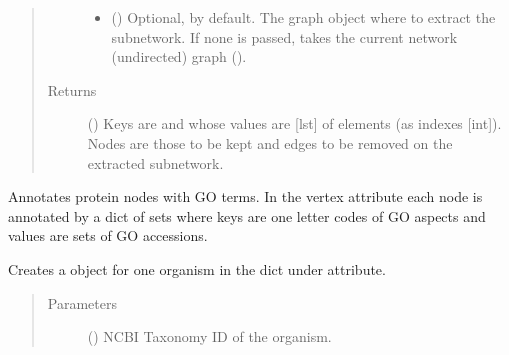 \documentclass[letterpaper,10pt,english]{sphinxmanual}
\begin{document}
\begin{fulllineitems}
\begin{fulllineitems}
\begin{quote}
\begin{description}
\begin{itemize}
\item {} 
 () \textendash{} Optional,  by default. The graph object where to
extract the subnetwork. If none is passed, takes the current
network (undirected) graph
().

\end{itemize}

\item[{Returns}] \leavevmode
() \textendash{} Keys are  and  whose
values are {[}lst{]} of elements (as indexes {[}int{]}). Nodes are
those to be kept and edges to be removed on the extracted
subnetwork.

\end{description}\end{quote}

\end{fulllineitems}


\begin{fulllineitems}
\label{\detokenize{main:pypath.main.PyPath.get_taxon}}
\end{fulllineitems}


\begin{fulllineitems}
\label{\detokenize{main:pypath.main.PyPath.go_annotate}}
Annotates protein nodes with GO terms. In the  vertex
attribute each node is annotated by a dict of sets where keys are
one letter codes of GO aspects and values are sets of GO accessions.

\end{fulllineitems}


\begin{fulllineitems}
\label{\detokenize{main:pypath.main.PyPath.go_dict}}
Creates a  object for one organism in the
dict under  attribute.
\begin{quote}\begin{description}
\item[{Parameters}] \leavevmode
{} () \textendash{} NCBI Taxonomy ID of the organism.


\end{description}
\end{quote}
\end{fulllineitems}
\end{fulllineitems}
\end{document}
